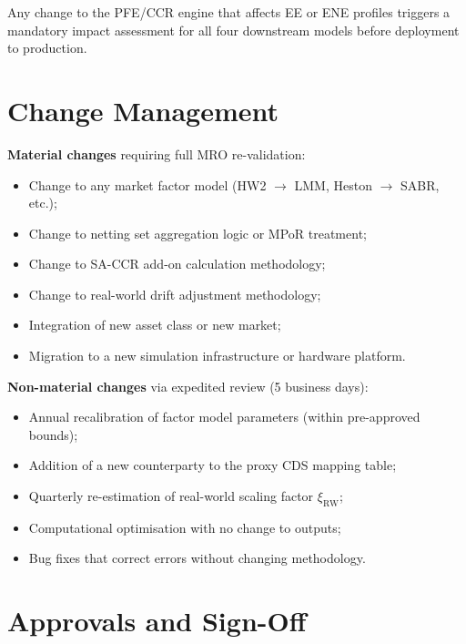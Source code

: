 \documentclass[11pt,a4paper]{article}
\begin{document}
Any change to the PFE/CCR engine that affects EE or ENE profiles triggers
a mandatory impact assessment for all four downstream models before deployment
to production.

\section{Change Management}

\textbf{Material changes} requiring full MRO re-validation:

\begin{itemize}[noitemsep]
  \item Change to any market factor model (HW2 $\to$ LMM, Heston $\to$ SABR, etc.);
  \item Change to netting set aggregation logic or MPoR treatment;
  \item Change to SA-CCR add-on calculation methodology;
  \item Change to real-world drift adjustment methodology;
  \item Integration of new asset class or new market;
  \item Migration to a new simulation infrastructure or hardware platform.
\end{itemize}

\textbf{Non-material changes} via expedited review (5 business days):

\begin{itemize}[noitemsep]
  \item Annual recalibration of factor model parameters (within pre-approved bounds);
  \item Addition of a new counterparty to the proxy CDS mapping table;
  \item Quarterly re-estimation of real-world scaling factor $\xi_{\text{RW}}$;
  \item Computational optimisation with no change to outputs;
  \item Bug fixes that correct errors without changing methodology.
\end{itemize}

\section{Approvals and Sign-Off}
\end{document}
